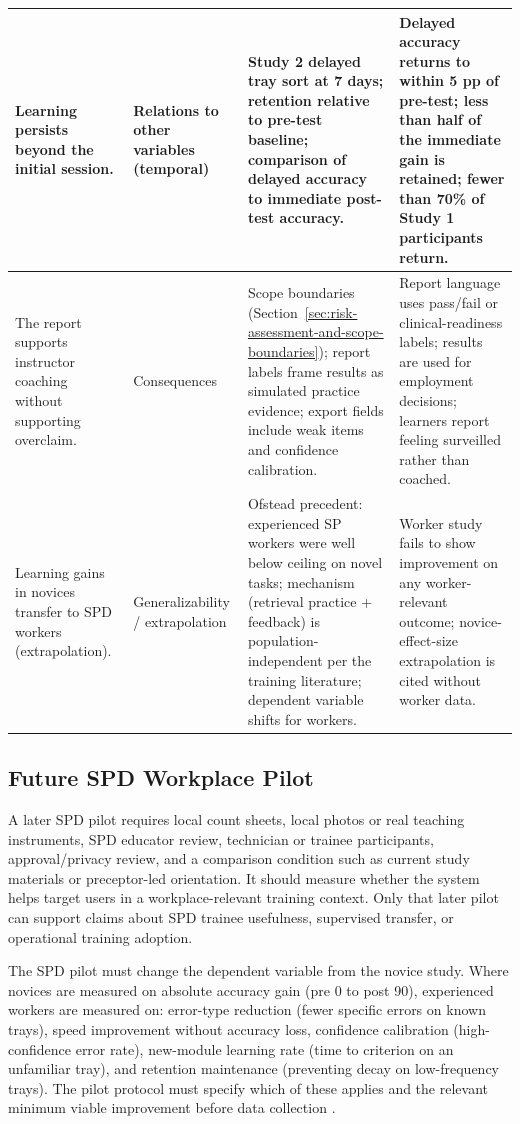 \documentclass[10pt,a4paper]{article}
\begin{document}
\begin{table}[H]
\begin{tabularx}{\textwidth}{|>{\raggedright\arraybackslash}X|>{\raggedright\arraybackslash}X|>{\raggedright\arraybackslash}X|>{\raggedright\arraybackslash}X|}
\hline
Learning persists beyond the initial session. & Relations to other variables (temporal) & Study 2 delayed tray sort at 7 days; retention relative to pre-test baseline; comparison of delayed accuracy to immediate post-test accuracy. & Delayed accuracy returns to within 5 pp of pre-test; less than half of the immediate gain is retained; fewer than 70\% of Study 1 participants return. \\
\hline
The report supports instructor coaching without supporting overclaim. & Consequences & Scope boundaries (Section~\ref{sec:risk-assessment-and-scope-boundaries}); report labels frame results as simulated practice evidence; export fields include weak items and confidence calibration. & Report language uses pass/fail or clinical-readiness labels; results are used for employment decisions; learners report feeling surveilled rather than coached. \\
\hline
Learning gains in novices transfer to SPD workers (extrapolation). & Generalizability / extrapolation & Ofstead precedent: experienced SP workers were well below ceiling on novel tasks; mechanism (retrieval practice + feedback) is population-independent per the training literature; dependent variable shifts for workers. & Worker study fails to show improvement on any worker-relevant outcome; novice-effect-size extrapolation is cited without worker data. \\
\hline
\end{tabularx}
\end{table}
\subsection{Future SPD Workplace Pilot}


A later SPD pilot requires local count sheets, local photos or real teaching
instruments, SPD educator review, technician or trainee participants,
approval/privacy review, and a comparison condition such as current study
materials or preceptor-led orientation. It should measure whether the system
helps target users in a workplace-relevant training context. Only that later
pilot can support claims about SPD trainee usefulness, supervised transfer, or
operational training adoption.

The SPD pilot must change the dependent variable from the novice study. Where
novices are measured on absolute accuracy gain (pre 0 to post 90), experienced
workers are measured on: error-type reduction (fewer specific errors on known
trays), speed improvement without accuracy loss, confidence calibration
(high-confidence error rate), new-module learning rate (time to criterion on
an unfamiliar tray), and retention maintenance (preventing decay on
low-frequency trays). The pilot protocol must specify which of these applies
and the relevant minimum viable improvement before data collection
\cite{kirkpatrick-evaluation-1994, arthur-et-al-2003}.
\end{document}
